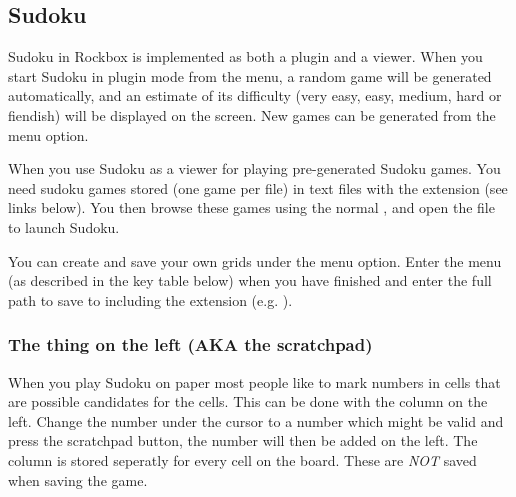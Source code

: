 \subsection{\label{ref:Sudoku}Sudoku}
Sudoku in Rockbox is implemented as both a plugin and a viewer.
When you start Sudoku in plugin mode from the  menu, a 
random game will be generated automatically, and an estimate of its difficulty
(very easy, easy, medium, hard or fiendish) will be displayed on the screen.
New games can be generated from the  menu option.

When you use Sudoku as a viewer for playing pre-generated Sudoku games.
You need sudoku games stored (one game per file) in text files with the
 extension (see links below). You then browse these games using the
normal , and open the file to launch Sudoku.

You can create and save your own grids under the  menu option.
Enter the menu (as described in the key table below) when you have finished and
 enter the full path to save to including the  extension 
 (e.g. ).

\subsubsection{The thing on the left (AKA the scratchpad)}
When you play Sudoku on paper most people like to mark numbers in cells that 
are possible candidates for the cells.
This can be done with the column on the left. Change the number
under the cursor to a number which might be valid and press the scratchpad
button, the number will then be added on the left.
The column is stored seperatly for every cell on the board.
These are \emph{NOT} saved when saving the game.

